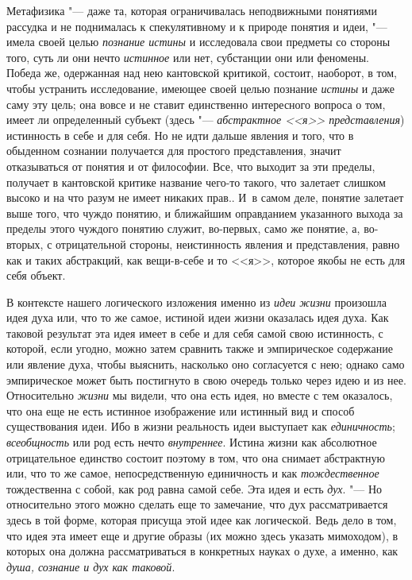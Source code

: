 {{Метафизика "--- даже та, которая ограничивалась
неподвижными понятиями рассудка и не поднималась к спекулятивному и к
природе понятия и идеи, "--- имела своей целью {\em познание истины} и
исследовала свои предметы со стороны того, суть ли они нечто
{\em истинное} или нет,
субстанции они или феномены. Победа же, одержанная над нею кантовской
критикой, состоит, наоборот, в том, чтобы устранить исследование, имеющее
своей целью познание {\em истины}
и даже саму эту цель; она вовсе и не ставит единственно
интересного вопроса о том, имеет ли определенный субъект (здесь
"--- {\em абстрактное <<я>> представления})
истинность в себе и для себя. Но не идти дальше явления и
того, что в обыденном сознании получается для простого представления,
значит отказываться от понятия и от философии. Все, что выходит за эти
пределы, получает в кантовской критике название чего-то такого, что
залетает слишком высоко и на что разум не имеет никаких прав.. И~в самом
деле, понятие залетает выше того, что чуждо понятию, и ближайшим
оправданием указанного выхода за пределы этого чуждого понятию служит,
во-первых, само же понятие, а, во-вторых, с отрицательной
стороны, неистинность явления и представления, равно как и таких
абстракций, как вещи-в-себе и то <<я>>, которое якобы не есть для себя
объект.

В контексте нашего логического изложения именно из
{\em идеи жизни}
произошла идея духа или, что то же самое, истиной идеи жизни
оказалась идея духа. Как таковой результат эта идея имеет в себе и для себя
самой свою истинность, с которой, если угодно, можно затем сравнить также и
эмпирическое содержание или явление духа, чтобы выяснить, насколько оно
согласуется с нею; однако само эмпирическое может быть постигнуто в свою
очередь только через идею и из нее. Относительно
{\em жизни} мы видели,
что она есть идея, но вместе с тем оказалось, что она еще не есть истинное
изображение или истинный вид и способ существования идеи. Ибо в жизни
реальность идеи выступает как
{\em единичность};
{\em всеобщность} или род
есть нечто {\em внутреннее}.
Истина жизни как абсолютное отрицательное единство состоит
поэтому в том, что она снимает абстрактную или, что то же самое,
непосредственную единичность и как
{\em тождественное}
тождественна с собой, как род равна самой себе. Эта идея и
есть {\em дух}. "--- Но
относительно этого можно сделать еще то замечание, что дух рассматривается
здесь в той форме, которая присуща этой идее как логической. Ведь дело в
том, что идея эта имеет еще и другие образы (их можно здесь указать
мимоходом), в которых она должна рассматриваться в конкретных науках о
духе, а именно, как {\em душа, сознание
и дух как таковой}.

}}
